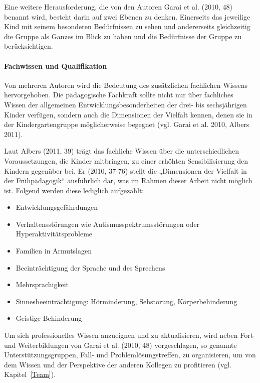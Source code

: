 Eine weitere Herausforderung, die von den Autoren Garai et al. (2010, 48) benannt wird, besteht darin auf zwei Ebenen zu denken. Einerseits das jeweilige Kind mit seinem besonderen Bedürfnissen zu sehen und andererseits gleichzeitig die Gruppe als Ganzes im Blick zu haben und die Bedürfnisse der Gruppe zu berücksichtigen.  

\paragraph{Fachwissen und Qualifikation}
Von mehreren Autoren wird die Bedeutung des zusätzlichen fachlichen Wissens hervorgehoben. Die pädagogische Fachkraft sollte nicht nur über fachliches Wissen der allgemeinen Entwicklungsbesonderheiten der drei- bis sechs\-jährigen Kinder verfügen, sondern auch die Dimensionen der Vielfalt kennen, denen sie in der Kindergartengruppe möglicherweise begegnet (vgl. Garai et al. 2010, Albers 2011). 

Laut Albers (2011, 39) trägt das fachliche Wissen über die unterschiedlichen Voraussetzungen, die Kinder mitbringen, zu einer erhöhten Sensibilisierung den Kindern gegenüber bei. Er (2010, 37-76) stellt die „Dimensionen der Vielfalt in der Frühpädagogik“ ausführlich dar, was im Rahmen dieser Arbeit nicht möglich ist. Folgend werden diese lediglich aufgezählt: 

\begin{itemize}
\item Entwicklungsgefährdungen
\item Verhaltensstörungen wie Autismusspektrumsstörungen oder Hyperaktivitätsprobleme
\item Familien in Armutslagen
\item Beeinträchtigung der Sprache und des Sprechens
\item Mehrsprachigkeit
\item Sinnesbeeinträchtigung: Hörminderung, Sehstörung, Körperbehinderung
\item Geistige Behinderung
\end{itemize} 

Um sich professionelles Wissen anzueignen und zu aktualisieren, wird neben Fort- und Weiterbildungen von Garai et al. (2010, 48) vorgeschlagen, so genannte Unterstützungsgruppen, Fall- und Problemlösungstreffen, zu organisieren, um von dem Wissen und der Perspektive der anderen Kollegen zu profitieren (vgl. Kapitel~\ref{Team}).

